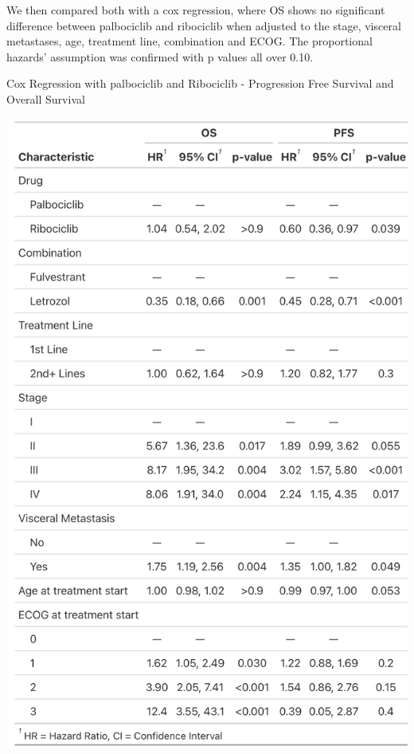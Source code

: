 We then compared both with a cox regression, where OS shows no significant difference between palbociclib and ribociclib when adjusted to the stage, visceral metastases, age, treatment line, combination and ECOG. The proportional hazards' assumption was confirmed with p values all over 0.10.
\begin{table}[ht]
  \centering
  \caption{Cox Regression with palbociclib and Ribociclib - Progression Free Survival and Overall Survival}\label{tab:cox} 
  \includegraphics[scale=0.20]{figures/cox_both.png}%

\end{table}

